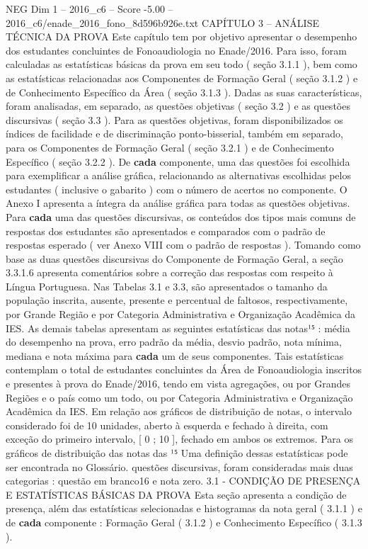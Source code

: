 \begin{textsample}{NEG Dim 1 – 2016\_c6 – Score -5.00 – 2016\_c6/enade\_2016\_fono\_8d596b926e.txt}  \label{ex:f1_neg_049}
CAPÍTULO 3 – ANÁLISE TÉCNICA DA PROVA Este capítulo tem por objetivo apresentar o desempenho dos estudantes concluintes de Fonoaudiologia no Enade/2016.
Para isso, foram calculadas as estatísticas básicas da prova em seu todo ( seção 3.1.1 ), bem como as estatísticas relacionadas aos Componentes de Formação Geral ( seção 3.1.2 ) e de Conhecimento Específico da Área ( seção 3.1.3 ).
Dadas as suas características, foram analisadas, em separado, as questões objetivas ( seção 3.2 ) e as questões discursivas ( seção 3.3 ).
Para as questões objetivas, foram disponibilizados os índices de facilidade e de discriminação ponto-bisserial, também em separado, para os Componentes de Formação Geral ( seção 3.2.1 ) e de Conhecimento Específico ( seção 3.2.2 ).
De \textbf{cada} componente, uma das questões foi escolhida para exemplificar a análise gráfica, relacionando as alternativas escolhidas pelos estudantes ( inclusive o gabarito ) com o número de acertos no componente.
O Anexo I apresenta a íntegra da análise gráfica para todas as questões objetivas.
Para \textbf{cada} uma das questões discursivas, os conteúdos dos tipos mais comuns de respostas dos estudantes são apresentados e comparados com o padrão de respostas esperado ( ver Anexo VIII com o padrão de respostas ).
Tomando como base as duas questões discursivas do Componente de Formação Geral, a seção 3.3.1.6 apresenta comentários sobre a correção das respostas com respeito à Língua Portuguesa.
Nas Tabelas 3.1 e 3.3, são apresentados o tamanho da população inscrita, ausente, presente e percentual de faltosos, respectivamente, por Grande Região e por Categoria Administrativa e Organização Acadêmica da IES.
As demais tabelas apresentam as seguintes estatísticas das notas¹⁵ : média do desempenho na prova, erro padrão da média, desvio padrão, nota mínima, mediana e nota máxima para \textbf{cada} um de seus componentes.
Tais estatísticas contemplam o total de estudantes concluintes da Área de Fonoaudiologia inscritos e presentes à prova do Enade/2016, tendo em vista agregações, ou por Grandes Regiões e o país como um todo, ou por Categoria Administrativa e Organização Acadêmica da IES.
Em relação aos gráficos de distribuição de notas, o intervalo considerado foi de 10 unidades, aberto à esquerda e fechado à direita, com exceção do primeiro intervalo, [ 0 ; 10 ], fechado em ambos os extremos.
Para os gráficos de distribuição das notas das ¹⁵ Uma definição dessas estatísticas pode ser encontrada no Glossário. questões discursivas, foram consideradas mais duas categorias : questão em branco16 e nota zero. 3.1 - CONDIÇÃO DE PRESENÇA E ESTATÍSTICAS BÁSICAS DA PROVA Esta seção apresenta a condição de presença, além das estatísticas selecionadas e histogramas da nota geral ( 3.1.1 ) e de \textbf{cada} componente : Formação Geral ( 3.1.2 ) e Conhecimento Específico ( 3.1.3 ).

\end{textsample}

